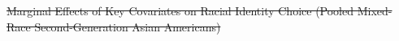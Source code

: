 \documentclass[12pt,english]{article}
\providecommand{\DIFdeltex}[1]{{\protect\color{red}\sout{#1}}}                      %
\providecommand{\DIFaddend}{} %
\providecommand{\DIFdelbegin}{} %
\providecommand{\DIFdelFL}[1]{\DIFdel{#1}} %
\providecommand{\DIFdel}[1]{\texorpdfstring{\DIFdeltex{#1}}{}} %
\newcommand{\DIFscaledelfig}{0.5}
\newlength{\DIFdelgraphicswidth} %
\newlength{\DIFdelgraphicsheight} %
\newcommand{\DIFdelincludegraphics}[2][]{%
\sbox{\DIFdelgraphicsbox}{\DIFOincludegraphics[#1]{#2}}%
\settoboxwidth{\DIFdelgraphicswidth}{\DIFdelgraphicsbox} %
\settoboxtotalheight{\DIFdelgraphicsheight}{\DIFdelgraphicsbox} %
\scalebox{\DIFscaledelfig}{%
\parbox[b]{\DIFdelgraphicswidth}{\usebox{\DIFdelgraphicsbox}\\[-\baselineskip] \rule{\DIFdelgraphicswidth}{0em}}\llap{\resizebox{\DIFdelgraphicswidth}{\DIFdelgraphicsheight}{%
\setlength{\unitlength}{\DIFdelgraphicswidth}%
\begin{picture}(1,1)%
\thicklines\linethickness{2pt} %
{\color[rgb]{1,0,0}\put(0,0){\framebox(1,1){}}}%
{\color[rgb]{1,0,0}\put(0,0){\line( 1,1){1}}}%
{\color[rgb]{1,0,0}\put(0,1){\line(1,-1){1}}}%
\end{picture}%
}\hspace*{3pt}}} %
} %
\DeclareRobustCommand{\DIFaddend}{\DIFOaddend \let\includegraphics\DIFOincludegraphics} %
\DeclareRobustCommand{\DIFdelbegin}{\DIFOdelbegin \let\includegraphics\DIFdelincludegraphics} %
\begin{document}
\newpage
\pagebreak

\DIFaddend %

\DIFdelbegin %
{%
\DIFdelFL{Marginal Effects of Key Covariates on Racial Identity Choice (Pooled Mixed-Race Second-Generation Asian Americans)}}
\DIFdelFL{\label{fig:marginal-effects-second-pooled}
}%
\end{document}
